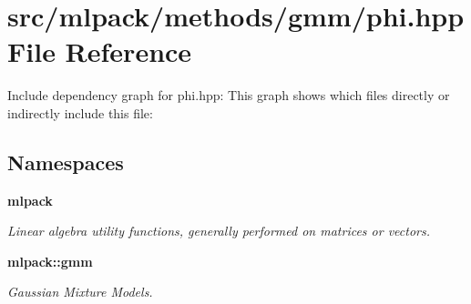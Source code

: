 \section{src/mlpack/methods/gmm/phi.hpp File Reference}
\label{phi_8hpp}
Include dependency graph for phi.\-hpp\-:
This graph shows which files directly or indirectly include this file\-:
\subsection*{Namespaces}
\begin{DoxyCompactItemize}
\item 
{\bf mlpack}
\begin{DoxyCompactList}\small\item\em Linear algebra utility functions, generally performed on matrices or vectors. \end{DoxyCompactList}\item 
{\bf mlpack\-::gmm}
\begin{DoxyCompactList}\small\item\em Gaussian Mixture Models. \end{DoxyCompactList}\end{DoxyCompactItemize}
